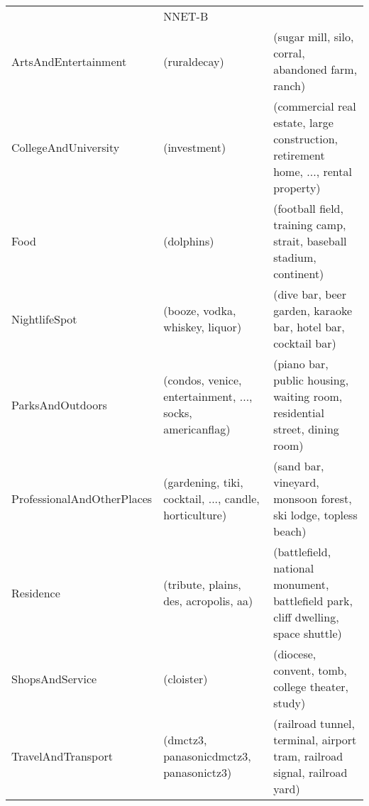 \begin{landscape}
\begin{table}[]
\begin{tabular}{lll}
& NNET-B                                                                                       &                                                                                                     \\
ArtsAndEntertainment       & (ruraldecay)                                                                              & (sugar mill, silo, corral, abandoned farm, ranch)                                                   \\
CollegeAndUniversity       & (investment)                                                                              & (commercial real estate, large construction, retirement home, ..., rental property) \\
Food                       & (dolphins)                                                                                & (football field, training camp, strait, baseball stadium, continent)                                \\
NightlifeSpot              & (booze, vodka, whiskey, liquor)                                                           & (dive bar, beer garden, karaoke bar, hotel bar, cocktail bar)                                       \\
ParksAndOutdoors           & (condos, venice, entertainment, ..., socks, americanflag)                                 & (piano bar, public housing, waiting room, residential street, dining room)                          \\
ProfessionalAndOtherPlaces & (gardening, tiki, cocktail, ..., candle, horticulture)                                    & (sand bar, vineyard, monsoon forest, ski lodge, topless beach)                                      \\
Residence                  & (tribute, plains, des, acropolis, aa)                                                     & (battlefield, national monument, battlefield park, cliff dwelling, space shuttle)                   \\
ShopsAndService            & (cloister)                                                                                & (diocese, convent, tomb, college theater, study)                                                    \\
TravelAndTransport         & (dmctz3, panasonicdmctz3, panasonictz3)                                                   & (railroad tunnel, terminal, airport tram, railroad signal, railroad yard)                           \\

\end{tabular}
\end{table}
\end{landscape}

